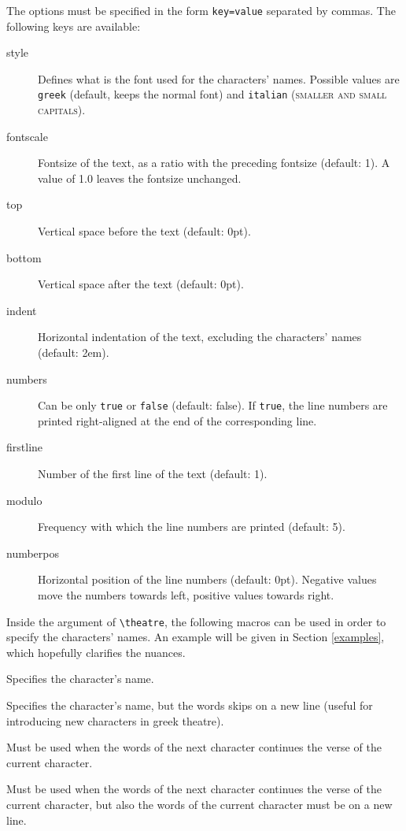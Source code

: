 \documentclass[11pt,a4paper]{article}
\begin{document}
	The options must be specified in the form \verb|key=value| separated by commas. The following keys are available:
	\begin{description}
    \item[style] Defines what is the font used for the characters' names. Possible values are \verb|greek| (default, keeps the normal font) and \verb|italian| ({\smaller\scshape smaller and small capitals}).
		\item[fontscale] Fontsize of the text, as a ratio with the preceding fontsize (default: 1). A value of 1.0 leaves the fontsize  unchanged.
		\item[top] Vertical space before the text (default: 0pt).
		\item[bottom] Vertical space after the text (default: 0pt).
		\item[indent] Horizontal indentation of the text, excluding the characters' names (default: 2em).
		\item[numbers] Can be only \verb|true| or \verb|false| (default: false). If \verb|true|, the line numbers are printed right-aligned at the end of the corresponding line.
		\item[firstline] Number of the first line of the text (default: 1).
		\item[modulo] Frequency with which the line numbers are printed (default: 5).
		\item[numberpos] Horizontal position of the line numbers (default: 0pt). Negative values move the numbers towards left, positive values towards right.
	\end{description}
	
	Inside the argument of \verb|\theatre|, the following macros can be used in order to specify the characters' names. An example will be given in Section \ref{examples}, which hopefully clarifies the nuances.
	\begin{description}[font=\normalfont]
		\item[\texttt{\textbackslash speak\{}\emph{Name}\texttt{\}}] Specifies the character's name.
		\item[\texttt{\textbackslash Speak\{}\emph{Name}\texttt{\}}] Specifies the character's name, but the words skips on a new line (useful for introducing new characters in greek theatre).
		\item[\texttt{\textbackslash emispeak\{}\emph{Name}\texttt{\}\{}\emph{words}\texttt{\}}] Must be used when the words of the next character continues the verse of the current character.
		\item[\texttt{\textbackslash emiSpeak\{}\emph{Name}\texttt{\}\{}\emph{words}\texttt{\}}] Must be used when the words of the next character continues the verse of the current character, but also the words of the current character must be on a new line.
	\end{description}
\end{document}
